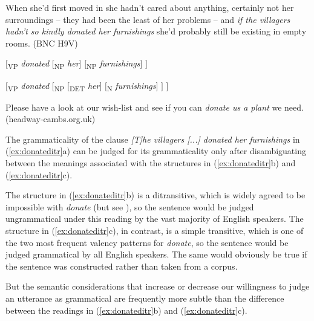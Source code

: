 \begin{exe}
\ex
\begin{xlist}
\label{ex:donateditr}

\ex When she'd first moved in she hadn't cared about anything, certainly not her surroundings -- they had been the least of her problems -- and \textit{if the villagers hadn't so kindly donated her furnishings} she'd probably still be existing in empty rooms. (BNC H9V)

\ex $[$\textsubscript{VP} \textit{donated }$[$\textsubscript{NP} \textit{her}$]$ $[$\textsubscript{NP} \textit{furnishings}$]$ $]$

\ex $[$\textsubscript{VP} \textit{donated }$[$\textsubscript{NP} $[$\textsubscript{DET }\textit{her}$]$ $[$\textsubscript{N} \textit{furnishings}$]$ $]$ $]$

\ex Please have a look at our wish\hyp{}list and see if you can \textit{donate us a plant} we need. (headway-cambs.org.uk)

\end{xlist}
\end{exe}\largerpage[-1]

The grammaticality  of the clause \textit{[T]he villagers [...] donated her furnishings} in (\ref{ex:donateditr}a) can be judged for its grammaticality only after disambiguating between the meanings associated with the structures in (\ref{ex:donateditr}b) and (\ref{ex:donateditr}c).

The structure in (\ref{ex:donateditr}b) is a ditransitive,  which is widely agreed to be impossible with \textit{donate} (but see \citealt{stefanowitsch_linguistics_2007}), so the sentence would be judged ungrammatical  under this reading by the vast majority of English speakers. The structure in (\ref{ex:donateditr}c), in contrast, is a simple transitive,  which is one of the two most frequent valency  patterns for \textit{donate}, so the sentence would be judged grammatical by all English speakers. The same would obviously be true if the sentence was constructed rather than taken from a corpus.

But the semantic  considerations that increase or decrease our willingness to judge an utterance as grammatical are frequently more subtle than the difference between the readings in (\ref{ex:donateditr}b) and (\ref{ex:donateditr}c).


